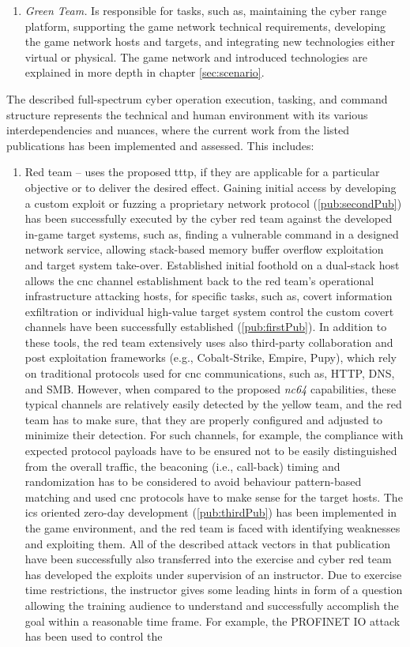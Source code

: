 \begin{enumerate}
    \item \textit{Green Team.} Is responsible for tasks, such as, maintaining the cyber range platform, supporting the game network technical requirements, developing the game network hosts and targets, and integrating new technologies either virtual or physical. The game network and introduced technologies are explained in more depth in chapter \ref{sec:scenario}.
\end{enumerate}

The described full-spectrum cyber operation execution, tasking, and command structure represents the technical and human environment with its various interdependencies and nuances, where the current work from the listed publications has been implemented and assessed. This includes:
\begin{enumerate}
    \item Red team -- uses the proposed \gls{tttp}, if they are applicable for a particular objective or to deliver the desired effect. Gaining initial access by developing a custom exploit or fuzzing a proprietary network protocol (\ref{pub:secondPub}) has been successfully executed by the cyber red team against the developed in-game target systems, such as, finding a vulnerable command in a designed network service, allowing stack-based memory buffer overflow exploitation and target system take-over. Established initial foothold on a dual-stack host allows the \gls{cnc} channel establishment back to the red team's operational infrastructure attacking hosts, for specific tasks, such as, covert information exfiltration or individual high-value target system control the custom covert channels have been successfully established (\ref{pub:firstPub}). In addition to these tools, the red team extensively uses also third-party collaboration and post exploitation frameworks (e.g., Cobalt-Strike, Empire, Pupy), which rely on traditional protocols used for \gls{cnc} communications, such as, HTTP, DNS, and SMB. However, when compared to the proposed \textit{nc64} capabilities, these typical channels are relatively easily detected by the yellow team, and the red team has to make sure, that they are properly configured and adjusted to minimize their detection. For such channels, for example, the compliance with expected protocol payloads have to be ensured not to be easily distinguished from the overall traffic, the beaconing (i.e., call-back) timing and randomization has to be considered to avoid behaviour pattern-based matching and used \gls{cnc} protocols have to make sense for the target hosts. The \gls{ics} oriented zero-day development (\ref{pub:thirdPub}) has been implemented in the game environment, and the red team is faced with identifying weaknesses and exploiting them. All of the described attack vectors in that publication have been successfully also transferred into the exercise and cyber red team has developed the exploits under supervision of an instructor. Due to exercise time restrictions, the instructor gives some leading hints in form of a question allowing the training audience to understand and successfully accomplish the goal within a reasonable time frame. For example, the PROFINET IO attack has been used to control the 
\end{enumerate}

